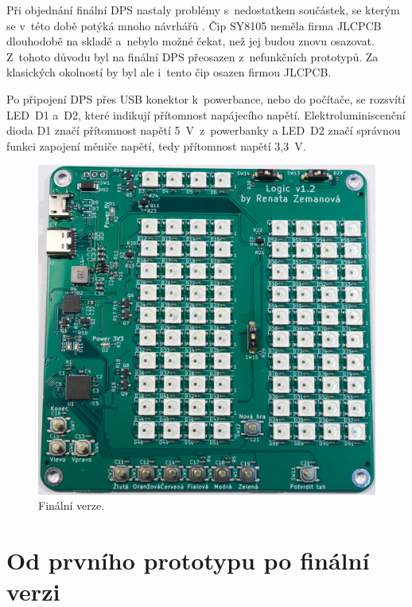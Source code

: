   Při objednání finální DPS nastaly problémy s~nedostatkem součástek, se kterým se v~této době potýká mnoho návrhářů \cite{Nedostatek_soucastek}. 
  Čip SY8105 neměla firma JLCPCB dlouhodobě na skladě a~nebylo možné čekat, než jej budou znovu osazovat. Z~tohoto důvodu byl na finální DPS přeosazen 
  z~nefunkčních prototypů. Za klasických okolností by byl ale i~tento čip osazen firmou JLCPCB.

  Po připojení DPS přes USB konektor k~powerbance, nebo do počítače, se rozsvítí LED~D1 a~D2, které indikují přítomnost 
  napájecího napětí. Elektroluminiscenční dioda D1 značí přítomnost napětí 5~V~z~powerbanky a LED~D2 značí správnou funkci zapojení měniče napětí, tedy přítomnost 
  napětí 3,3~V.

  \begin{figure}[!h]
    \begin{center}
      \includegraphics[scale=0.35]{obrazky/Finalni_verze.jpg}
    \end{center}
    \caption[Finální verze]{Finální verze.}
  \end{figure}

  \chapter{Od prvního prototypu po finální verzi}

